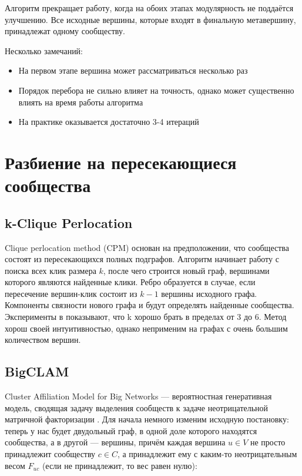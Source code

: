 \documentclass[12pt]{article}
\begin{document}
Алгоритм прекращает работу, когда на обоих этапах модулярность не поддаётся улучшению. Все исходные вершины, которые входят в финальную метавершину, принадлежат одному сообществу.

Несколько замечаний: 
\begin{itemize}
\item На первом этапе вершина может рассматриваться несколько раз
\item Порядок перебора не сильно влияет на точность, однако может существенно влиять на время работы алгоритма
\item На практике оказывается достаточно 3-4 итераций
\end{itemize}

\newpage


\section{Разбиение на пересекающиеся сообщества}

\subsection{k-Clique Perlocation}

Clique perlocation method (CPM) основан на предположении, что сообщества состоят из пересекающихся полных подграфов. Алгоритм начинает работу с поиска всех клик размера $k$, после чего строится новый граф, вершинами которого являются найденные клики. Ребро образуется в случае, если пересечение вершин-клик состоит из  $k-1$ вершины исходного графа. Компоненты связности нового графа и будут определять найденные сообщества. Эксперименты в \cite{cpm} показывают, что k хорошо брать в пределах от 3 до 6. Метод хорош своей интуитивностью, однако неприменим на графах с очень большим количеством вершин.

\subsection{BigCLAM}

Cluster Affiliation Model for Big Networks --- вероятностная генеративная модель, сводящая задачу выделения сообществ к задаче неотрицательной матричной факторизации \cite{bigclam}. Для начала немного изменим исходную постановку: теперь у нас будет двудольный граф, в одной доле которого находятся сообщества, а в другой --- вершины, причём каждая вершина $u \in V$ не просто принадлежит сообществу $c \in C$, а принадлежит ему с каким-то неотрицательным весом $F_{uc}$ (если не принадлежит, то вес равен нулю):
\end{document}
